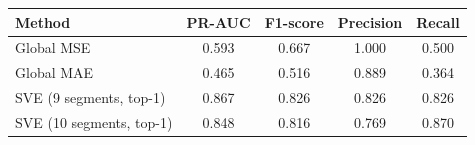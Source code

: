 \begin{tabular}{lcccc}
\hline
Method & PR-AUC & F1-score & Precision & Recall \\
\hline
Global MSE & 0.593 & 0.667 & 1.000 & 0.500 \\
Global MAE & 0.465 & 0.516 & 0.889 & 0.364 \\
SVE (9 segments, top-1) & 0.867 & 0.826 & 0.826 & 0.826 \\
SVE (10 segments, top-1) & 0.848 & 0.816 & 0.769 & 0.870 \\
\hline
\end{tabular}